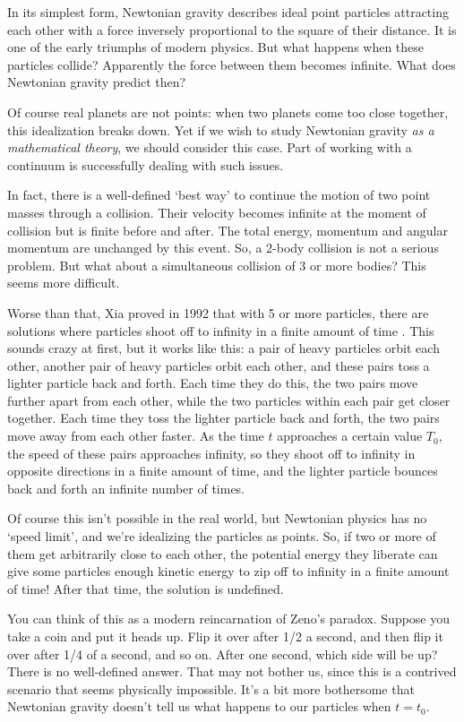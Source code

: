 \documentclass[12pt]{article}
\begin{document}
In its simplest form, Newtonian gravity describes ideal point particles attracting each other with a force inversely proportional to the square of their distance.  It is one of the early triumphs of modern physics.  But what happens when these particles collide?  Apparently the force between them becomes infinite.  What does Newtonian gravity predict then?

Of course real planets are not points: when two planets come too close together, this idealization breaks down.  Yet if we wish to study Newtonian gravity \emph{as a mathematical theory}, we should consider this case.  Part of working with a continuum is successfully dealing with such issues.

In fact, there is a well-defined `best way' to continue the motion of two point masses through a collision.  Their velocity becomes infinite at the moment of collision but is finite before and after.  The total energy, momentum and angular momentum are unchanged by this event.   So, a 2-body collision is not a serious problem.  But what about a simultaneous collision of 3 or more bodies?  This seems more difficult.

Worse than that, Xia proved in 1992 that with 5 or more particles, there are
solutions where particles shoot off to infinity in a finite amount of time \cite{SaariXia,Xia}.   This sounds crazy at first, but it works like this: a pair of heavy particles orbit each other, another pair of heavy particles orbit each other, and these pairs toss a lighter particle back and forth.  Each time they do this, the two pairs move further apart from each other, while the two particles within each pair get closer together.   Each time they toss the lighter particle back and forth, the two pairs move away from each other faster.  As the time $t$ approaches a certain value $T_0$, the speed of these pairs approaches infinity, so they shoot off to infinity in opposite directions in a finite amount of time, and the lighter particle bounces back and forth an infinite number of times.

Of course this isn't possible in the real world, but Newtonian physics has no `speed limit', and we're idealizing the particles as points. So, if two or more of them get arbitrarily close to each other, the potential energy they liberate can give some particles enough kinetic energy to zip off to infinity in a finite amount of time! After that time, the solution is undefined.  

You can think of this as a modern reincarnation of Zeno's paradox.  Suppose you take a coin and put it heads up.  Flip it over after 1/2 a second, and then flip it over after 1/4 of a second, and so on.  After one second, which side will be up?  There is no well-defined answer.  That may not bother us, since this is a contrived scenario that seems physically impossible.  It's a bit more bothersome that Newtonian gravity doesn't tell us what happens to our particles when $t = t_0$.
\end{document}
